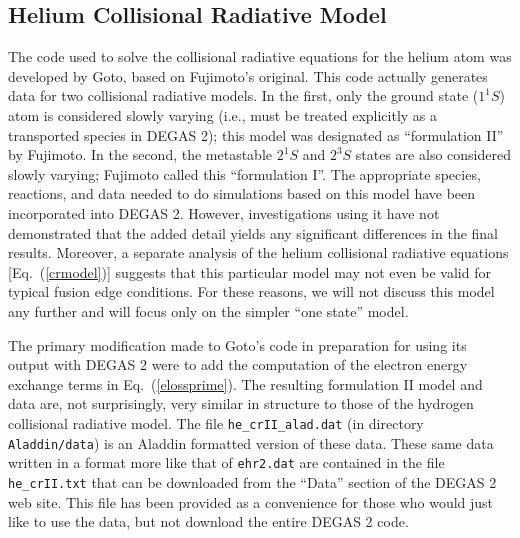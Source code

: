 \documentclass[12pt]{report}
\begin{document}
\subsection{Helium Collisional Radiative Model}
\label{HeCR}

The code used to solve the collisional radiative equations for
the helium atom was developed by Goto\cite{Goto2003},
based on Fujimoto's original\cite{Fuji79}.  This code actually
generates data for two collisional radiative models.  In the 
first, only the ground state ($1^{1}S$) atom is considered slowly
varying (i.e., must be treated explicitly as a transported
species in DEGAS 2); this model was designated as
``formulation II'' by Fujimoto.  In the second, the metastable
$2^{1}S$ and $2^{3}S$ states are also considered
slowly varying; Fujimoto called this ``formulation I''. 
The appropriate species, reactions, and
data needed to do simulations based on this model have been
incorporated into DEGAS 2.  However, investigations using it
have not demonstrated that the added detail yields any significant
differences in the final results.  Moreover, a separate analysis
of the helium collisional radiative equations [Eq.~(\ref{crmodel})]
suggests that this particular
model may not even be valid for typical fusion edge conditions.
For these reasons, we will not discuss this model any further and
will focus only on the simpler ``one state'' model.

The primary modification made to Goto's code in preparation
for using its output with DEGAS 2 were to add the 
computation of the electron energy exchange terms in
Eq.~(\ref{elossprime}). 
The resulting formulation II model and data are, not surprisingly, very
similar in structure to those of the hydrogen collisional 
radiative model.  
The file \verb+he_crII_alad.dat+ (in directory \verb+Aladdin/data+) is
an Aladdin formatted version of these data. These same data
written in a format more like that of {\tt ehr2.dat} are
contained in the file \verb+he_crII.txt+ 
that can be downloaded
from the ``Data'' section of the DEGAS 2 web site.  This file has
been provided as a convenience for those who would just like to
use the data, but not download the entire DEGAS 2 code.
\end{document}
